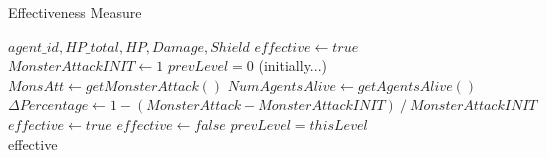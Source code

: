 \begin{algorithm}
\caption{Effectiveness Measure}
\begin{algorithmic}
\Require $agent\_id, HP\_total, HP, Damage, Shield$
\State $effective \leftarrow true$
\State $MonsterAttackINIT \leftarrow 1$
\State $prevLevel = 0$ (initially...)
\State $MonsAtt \leftarrow getMonsterAttack()$
\State $NumAgentsAlive \leftarrow getAgentsAlive()$
\State $\Delta Percentage \leftarrow 1-(MonsterAttack-MonsterAttackINIT)~/~MonsterAttackINIT$
\State $effective \leftarrow true$
\Else
\State $effective \leftarrow false$
\EndIf
\State $prevLevel = thisLevel$\\
\Return effective
\EndIf
\end{algorithmic}
\end{algorithm}



 
\vspace{1cm}
    
